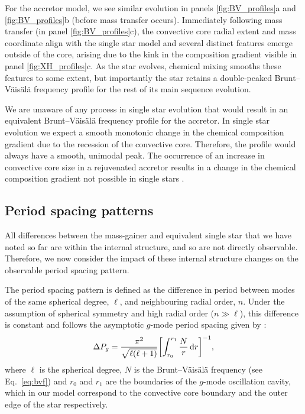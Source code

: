 \documentclass[desactivate]{aa}
\begin{document}
For the accretor model, we see similar evolution in panels \ref{fig:BV_profiles}a and \ref{fig:BV_profiles}b (before mass transfer occurs). Immediately following mass transfer (in panel \ref{fig:BV_profiles}c), the convective core radial extent and mass coordinate align with the single star model and several distinct features emerge outside of the core, arising due to the kink in the composition gradient visible in panel \ref{fig:XH_profiles}c. As the star evolves, chemical mixing smooths these features to some extent, but importantly the star retains a double-peaked Brunt–Väisälä frequency profile for the rest of its main sequence evolution.

We are unaware of any process in single star evolution that would result in an equivalent Brunt–Väisälä frequency profile for the accretor. In single star evolution we expect a smooth monotonic change in the chemical composition gradient due to the recession of the convective core. Therefore, the profile would always have a smooth, unimodal peak. The occurrence of an increase in convective core size in a rejuvenated accretor results in a change in the chemical composition gradient not possible in single stars \citep{Renzo+2023}.

\subsection{Period spacing patterns}\label{sec:period_spacing}

All differences between the mass-gainer and equivalent single star that we have noted so far are within the internal structure, and so are not directly observable. Therefore, we now consider the impact of these internal structure changes on the observable period spacing pattern.

The period spacing pattern is defined as the difference in period between modes of the same spherical degree, $\ell$, and neighbouring radial order, $n$. Under the assumption of spherical symmetry and high radial order ($n \gg \ell$), this difference is constant and follows the asymptotic $g$-mode period spacing given by \citet{Tassoul+1980}:
\begin{equation}\label{eq:period-spacing}
    \Delta P_g = \frac{\pi^2}{\sqrt{\ell(\ell+1)}} \qty[\int_{r_0}^{r_1} \frac{N}{r} \dd{r}]^{-1},
\end{equation}
where $\ell$ is the spherical degree, $N$ is the Brunt–Väisälä frequency (see Eq.~\ref{eq:bvf}) and $r_0$ and $r_1$ are the boundaries of the $g$-mode oscillation cavity, which in our model correspond to the convective core boundary and the outer edge of the star respectively.
\end{document}

